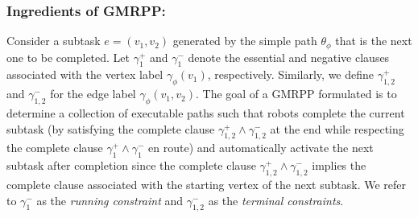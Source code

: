 \documentclass[Afour,sageh,times]{sagej}
\begin{document}
{ \subsubsection{Ingredients of GMRPP:}\label{sec:gmmpp1} Consider a subtask $e = (v_1, v_2)$ generated by the simple path $\theta_{\phi}$ that is the next one to be completed. Let $\gamma_1^+$ and $\gamma_1^-$ denote the essential and negative clauses associated with the vertex label $\gamma_\phi(v_1)$, respectively. Similarly, we define $\gamma_{1,2}^{+}$ and $\gamma_{1,2}^{-}$  for the edge label $\gamma_\phi(v_1, v_2)$. The goal of a GMRPP formulated  is to determine a collection of executable paths such that robots complete the current subtask (by satisfying the complete clause  $\gamma_{1,2}^+ \wedge \gamma_{1,2}^-$ at the end while respecting the complete clause $\gamma_1^+ \wedge \gamma_1^-$ en route) and automatically activate the next subtask after completion since the complete clause $\gamma_{1,2}^+ \wedge \gamma_{1,2}^-$ implies the complete clause associated with the starting vertex of the next subtask. We refer to $\gamma_1^-$ as the {\it running constraint} and $\gamma_{1,2}^- $  as the {\it terminal constraints}.

}
\end{document}
